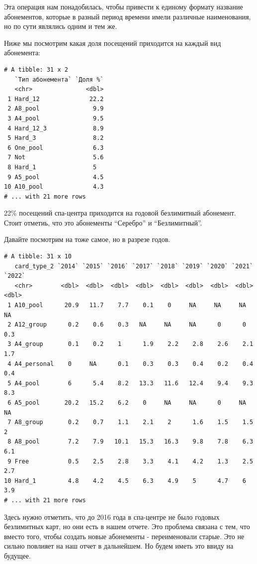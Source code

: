 \documentclass[
  letterpaper,
  DIV=11,
  numbers=noendperiod]{scrreprt}
\begin{document}
Эта операция нам понадобилась, чтобы привести к единому формату название
абонементов, которые в разный период времени имели различные
наименования, но по сути являлись одним и тем же.

Ниже мы посмотрим какая доля посещений приходится на каждый вид
абонемента:

\begin{verbatim}
# A tibble: 31 x 2
   `Тип абонемента` `Доля %`
   <chr>               <dbl>
 1 Hard_12              22.2
 2 А8_pool               9.9
 3 А4_pool               9.5
 4 Hard_12_3             8.9
 5 Hard_3                8.2
 6 One_pool              6.3
 7 Not                   5.6
 8 Hard_1                5  
 9 А5_pool               4.5
10 А10_pool              4.3
# ... with 21 more rows
\end{verbatim}

22\% посещений спа-центра приходится на годовой безлимитный абонемент.
Стоит отметиь, что это абонементы ``Серебро'' и ``Безлимитный''.

Давайте посмотрим на тоже самое, но в разрезе годов.

\begin{verbatim}
# A tibble: 31 x 10
   сard_type_2 `2014` `2015` `2016` `2017` `2018` `2019` `2020` `2021` `2022`
   <chr>        <dbl>  <dbl>  <dbl>  <dbl>  <dbl>  <dbl>  <dbl>  <dbl>  <dbl>
 1 А10_pool      20.9   11.7    7.7    0.1    0     NA     NA     NA     NA  
 2 А12_group      0.2    0.6    0.3   NA     NA     NA      0      0      0.3
 3 А4_group       0.1    0.2    1      1.9    2.2    2.8    2.6    2.1    1.7
 4 А4_personal    0     NA      0.1    0.3    0.3    0.4    0.2    0.4    0.4
 5 А4_pool        6      5.4    8.2   13.3   11.6   12.4    9.4    9.3    8.3
 6 А5_pool       20.2   15.2    6.2    0     NA     NA      0     NA     NA  
 7 А8_group       0.2    0.7    1.1    2.1    2      1.6    1.5    1.5    2  
 8 А8_pool        7.2    7.9   10.1   15.3   16.3    9.8    7.8    6.3    6.1
 9 Free           0.5    2.5    2.8    3.3    4.1    4.2    1.3    2.5    2.7
10 Hard_1         4.8    4.2    4.5    6.3    4.9    5      4.7    6      3.9
# ... with 21 more rows
\end{verbatim}

Здесь нужно отметить, что до 2016 года в спа-центре не было годовых
безлимитных карт, но они есть в нашем отчете. Это проблема связана с
тем, что вместо того, чтобы создать новые абонементы - переименовали
старые. Это не сильно повлияет на наш отчет в дальнейшем. Но будем иметь
это ввиду на будущее.
\end{document}
